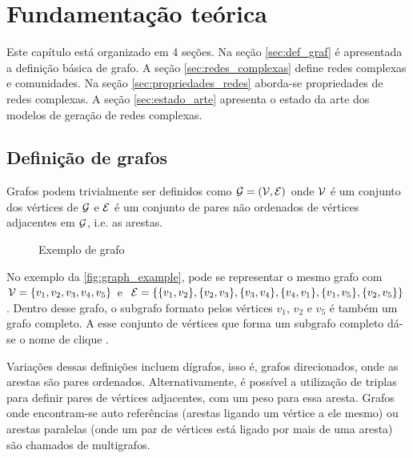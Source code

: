 \documentclass[notes.tex]{subfiles}
\begin{document}
\chapter{Fundamentação teórica}

Este capítulo está organizado em 4 seções.
Na seção \ref{sec:def_graf} é apresentada a definição básica de grafo.
A seção \ref{sec:redes_complexas} define redes complexas e comunidades.
Na seção \ref{sec:propriedades_redes} aborda-se propriedades de redes complexas.
A seção \ref{sec:estado_arte} apresenta o estado da arte dos modelos de geração de redes complexas.

\section{Definição de grafos\label{sec:def_graf}}

Grafos podem trivialmente ser definidos como $\operatorname{\mathcal{G}} = (\operatorname{\mathcal{V}}, \operatorname{\mathcal{E}})$ onde $\operatorname{\mathcal{V}}$ é um conjunto dos vértices de  $\operatorname{\mathcal{G}}$ e  $\operatorname{\mathcal{E}}$ é um conjunto de pares não ordenados de vértices adjacentes em $\operatorname{\mathcal{G}}$, i.e. as arestas.

\begin{figure}[htpb]
    \centering
    \caption{Exemplo de grafo}\label{fig:graph_example}
\end{figure}

No exemplo da \autoref{fig:graph_example}, pode se representar o mesmo grafo com $\operatorname{\mathcal{V}} = \{v_1, v_2, v_3, v_4, v_5\}$ e $\operatorname{\mathcal{E}} = \{\{v_1, v_2\}, \{v_2, v_3\}, \{v_3, v_4\}, \{v_4, v_1\}, \{v_1, v_5\}, \{v_2, v_5\}\}$.
Dentro desse grafo, o subgrafo formato pelos vértices $v_1$, $v_2$ e $v_5$ é também um grafo completo.
A esse conjunto de vértices que forma um subgrafo completo dá-se o nome de clique \cite{fortunato2010community}.

Variações dessas definições incluem dígrafos, isso é, grafos direcionados, onde as arestas são pares ordenados.
Alternativamente, é possível a utilização de triplas para definir pares de vértices adjacentes, com um peso para essa aresta.
Grafos onde encontram-se auto referências (arestas ligando um vértice a ele mesmo) ou arestas paralelas (onde um par de vértices está ligado por mais de uma aresta) são chamados de multigrafos.
\end{document}
